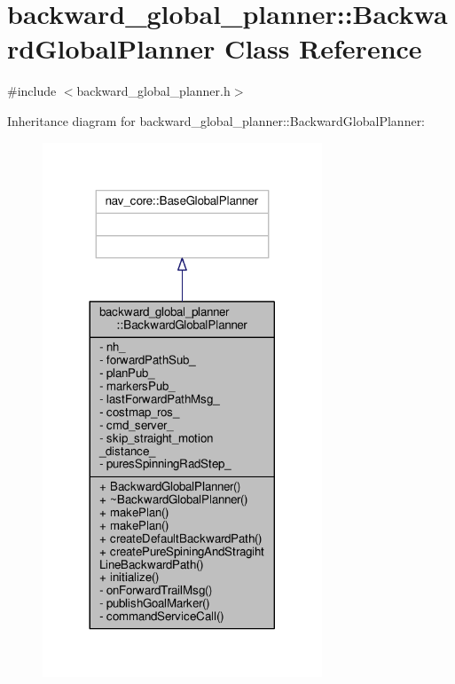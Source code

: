 \hypertarget{classbackward__global__planner_1_1BackwardGlobalPlanner}{}\section{backward\+\_\+global\+\_\+planner\+:\+:Backward\+Global\+Planner Class Reference}
\label{classbackward__global__planner_1_1BackwardGlobalPlanner}


{\ttfamily \#include $<$backward\+\_\+global\+\_\+planner.\+h$>$}



Inheritance diagram for backward\+\_\+global\+\_\+planner\+:\+:Backward\+Global\+Planner\+:
\nopagebreak
\begin{figure}[H]
\begin{center}
\leavevmode
\includegraphics[width=236pt]{classbackward__global__planner_1_1BackwardGlobalPlanner__inherit__graph}
\end{center}
\end{figure}


